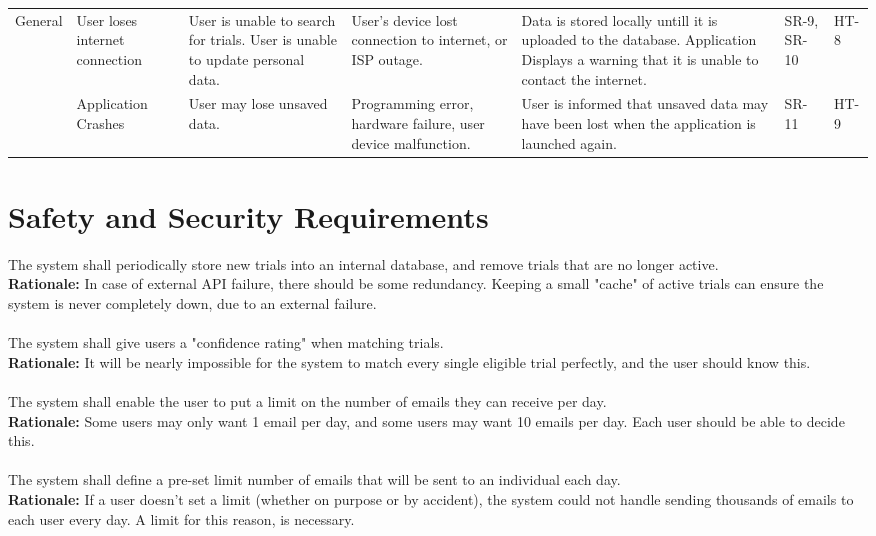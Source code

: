 \documentclass{article}
\begin{document}
\begin{table}[H]
{\begin{tabular}{|p{3cm}|p{3cm}p{3cm}p{3cm}p{3cm}p{3cm}p{3cm}|}
    \hline
  General  & User loses internet connection & User is unable to search for trials. User is unable to update personal data. & User's device lost connection to internet, or ISP outage.& Data is stored locally untill it is uploaded to the database. Application Displays a warning that it is unable to contact the internet. &  SR-9, SR-10 & HT-8 \\\cline{2-7}
  & Application Crashes & User may lose unsaved data. & Programming error, hardware failure, user device malfunction. & User is informed that unsaved data may have been lost when the application is launched again. &  SR-11 & HT-9 \\
    \hline
    \end{tabular}}
\end{table}


\section{Safety and Security Requirements}

The system shall periodically store new trials into an internal database, and remove trials that are no longer active.\\
\textbf{Rationale:} 
In case of external API failure, there should be some redundancy. Keeping a small "cache" of active trials can ensure the system is never
completely down, due to an external failure.\\~\\

The system shall give users a "confidence rating" when matching trials.\\
\textbf{Rationale:} 
It will be nearly impossible for the system to match every single eligible trial perfectly, and the user should know this.\\~\\

The system shall enable the user to put a limit on the number of emails they can receive per day.\\
\textbf{Rationale:}
Some users may only want 1 email per day, and some users may want 10 emails per day. Each user should be able to decide this.\\~\\

The system shall define a pre-set limit number of emails that will be sent to an individual each day.\\
\textbf{Rationale:}
If a user doesn't set a limit (whether on purpose or by accident), the system could not handle sending thousands of emails to each user every day. A limit for this reason, is necessary.\\~\\
\end{document}
